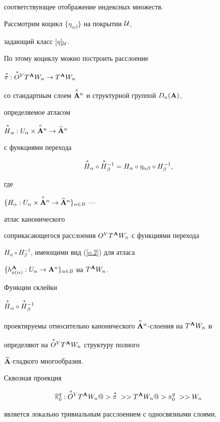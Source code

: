 \begin{pf}
соответствующее отображение индексных множеств.


Рассмотрим коцикл $\{\eta_{\alpha\beta}\}$ на покрытии $\cal U$,


задающий класс $[\eta]_{\cal U}$.


По этому коциклу можно построить расслоение


$\overset{\,\ast}{\pi}{}:{\overset{\,\ast}{O}{}}{}^VT^{\bold A} W_n\to T^{\bold A} W_n$


со стандартным слоем $\overset{\circ}{\bold A}{}^n$ и структурной группой $D_n({\bold A})$,


определяемое атласом


${\overset{\,\ast}{H}{}}_\alpha:U_\alpha\times\overset{\circ}{\bold A}{}^n\to\widehat{{\bold A}}{}^n$


с функциями перехода


\begin{equation}


\label{o.6}


{\puts H}_\alpha\circ


{\puts H}{}_\beta^{-1}=


H_\alpha\circ\eta_{\alpha\beta}\circ H_\beta^{-1},


\end{equation}


где


$\{H_\alpha:U_\alpha\times\overset{\circ}{\bold A}{}^n\to\widehat{{\bold A}}{}^n\}_{\alpha\in B}$ ---


атлас канонического


соприкасающегося расслоения $O^VT^{\bold A} W_n$ с функциями перехода


$H_\alpha\circ H_\beta^{-1}$, имеющими вид (\ref{o.2}) для атласа


$\{h^{\bold A}_{a(\alpha)}:U_\alpha\to{\bold A}^n\}_{\alpha\in B}$ на $T^{\bold A} W_n$.


Функции склейки


${\overset{\,\ast}{H}{}}_\alpha\circ{\overset{\,\ast}{H}{}}{}_\beta^{-1}$


проектируемы относительно канонического $\overset{\circ}{\bold A}{}^n$-слоения на $T^{\bold A} W_n$ и


определяют на ${\overset{\,\ast}{O}{}}{}^VT^{\bold A} W_n$ структуру полного


$\widehat{{\bold A}}$-гладкого многообразия.


Сквозная проекция


$$


\widehat\pi{}^q_0:{\puts O}{}^VT^\A W_n


@>{\puts\pi\;}>>T^\A W_n @>{\piqo\;}>>W_n


$$


является локально тривиальным расслоением с односвязными слоями,



\end{pf}

